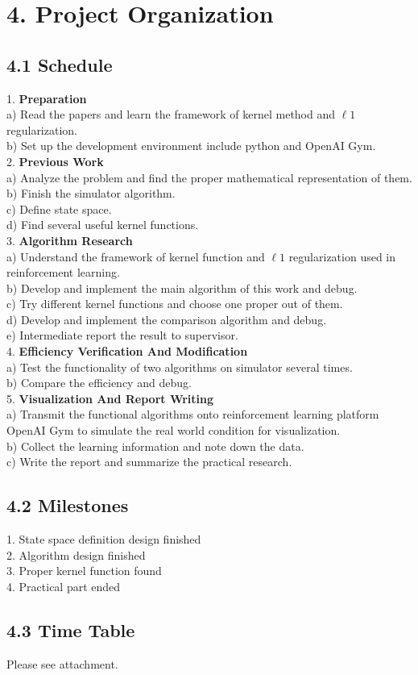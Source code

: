 \documentclass[12pt,a4paper,titlepage]{article}
\begin{document}
\newpage
\section*{4. Project Organization}
\subsection*{4.1 Schedule}
1. \textbf{Preparation}\\
a) Read the papers and learn the framework of kernel method and $\ell1$ regularization.\\
b) Set up the development environment include python and OpenAI Gym.\\

2. \textbf{Previous Work}\\
a) Analyze the problem and find the proper mathematical representation of them.\\
b) Finish the simulator algorithm.\\
c) Define state space.\\
d) Find several useful kernel functions.\\

3. \textbf{Algorithm Research}\\
a) Understand the framework of kernel function and $\ell1$ regularization used in reinforcement learning.\\
b) Develop and implement the main algorithm of this work and debug.\\
c) Try different kernel functions and choose one proper out of them.\\
d) Develop and implement the comparison algorithm and debug.\\
e) Intermediate report the result to supervisor.\\

4. \textbf{Efficiency Verification And Modification}\\
a) Test the functionality of two algorithms on simulator several times.\\
b) Compare the efficiency and debug.\\

5. \textbf{Visualization And Report Writing}\\
a) Transmit the functional algorithms onto reinforcement learning platform OpenAI Gym to simulate the real world condition for visualization.\\
b) Collect the learning information and note down the data.\\
c) Write the report and summarize the practical research.\\
\subsection*{4.2 Milestones}
1. State space definition design finished\\

2. Algorithm design finished\\

3. Proper kernel function found\\

4. Practical part ended
\subsection*{4.3 Time Table}
Please see attachment.

\end{document}
